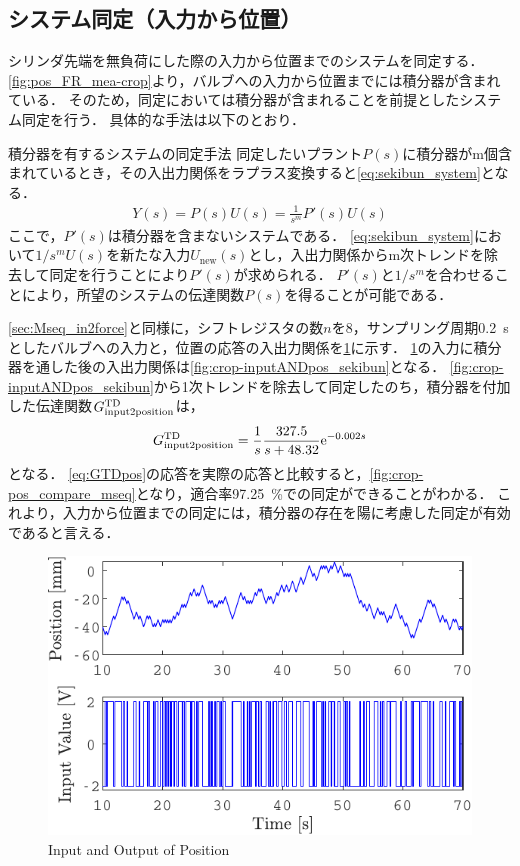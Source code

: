 \subsection{システム同定（入力から位置）}
シリンダ先端を無負荷にした際の入力から位置までのシステムを同定する．
\figname\ref{fig:pos_FR_mea-crop}より，バルブへの入力から位置までには積分器が含まれている．
そのため，同定においては積分器が含まれることを前提としたシステム同定\cite{竹下侑2014積分器を有するシステムの同定について}を行う．
具体的な手法は以下のとおり．
\begin{itembox}[l]{積分器を有するシステムの同定手法}
    同定したいプラント$P(s)$に積分器がm個含まれているとき，その入出力関係をラプラス変換すると\eqnname\ref{eq:sekibun_system}となる．
    \begin{align}
        \label{eq:sekibun_system}
        Y(s) = P(s)U(s) = \frac{1}{s^m}P'(s)U(s)
    \end{align}
    ここで，$P'(s)$は積分器を含まないシステムである．
    \eqnname\ref{eq:sekibun_system}において${1}/{s^m}U(s)$を新たな入力$U_{\mathrm{new}}(s)$とし，入出力関係からm次トレンドを除去して同定を行うことにより$P'(s)$が求められる．
    $P'(s)$と$1/s^m$を合わせることにより，所望のシステムの伝達関数$P(s)$を得ることが可能である．
\end{itembox}
\ref{sec:Mseq_in2force}と同様に，シフトレジスタの数$n$を8，サンプリング周期\SI{0.2}{s}としたバルブへの入力と，位置の応答の入出力関係を\figname\ref{fig:crop-inputANDpos}に示す．
\figname\ref{fig:crop-inputANDpos}の入力に積分器を通した後の入出力関係は\figname\ref{fig:crop-inputANDpos_sekibun}となる．
\figname\ref{fig:crop-inputANDpos_sekibun}から1次トレンドを除去して同定したのち，積分器を付加した伝達関数$G_{\mathrm{input}2\mathrm{position}}^{\mathrm{TD}}$は，
\begin{align}
    \label{eq:GTDpos}
    G_{\mathrm{input}2\mathrm{position}}^{\mathrm{TD}} = \frac{1}{s}\frac{327.5}{s+48.32}\mathrm{e}^{-0.002s}
\end{align}
となる．
\eqnname\ref{eq:GTDpos}の応答を実際の応答と比較すると，\figname\ref{fig:crop-pos_compare_mseq}となり，適合率\SI{97.25}{\%}での同定ができることがわかる．
これより，入力から位置までの同定には，積分器の存在を陽に考慮した同定が有効であると言える．
\begin{figure}[t]
    \centering
        \includegraphics[keepaspectratio, scale=1.0]{contents/SystemIdentification/figure/crop-inputANDpos.pdf}
        \caption{Input and Output of Position}
        \label{fig:crop-inputANDpos}
\end{figure}
